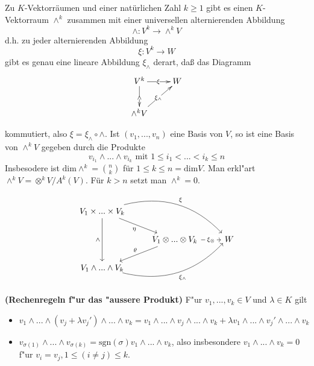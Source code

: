 \documentclass[8pt, a4paper, twocolumn, landscape]{article}
\begin{document}
\begin{theorem}
Zu $K$-Vektorräumen und einer natürlichen Zahl $k \geq 1$ gibt es einen $K$-Vektorraum
$\wedge^k$  zusammen mit einer universellen alternierenden Abbildung 
$$
\wedge: V^k \rightarrow \wedge ^k V
$$
d.h. zu jeder alternierenden Abbildung 
$$
\xi: V^k \rightarrow W
$$
gibt es genau eine lineare Abbildung $\xi_{\wedge}$ derart, daß das Diagramm 
\begin{gather*}
  \xymatrix{V^k   \ar[d]|{\wedge} \ar[r]|{\xi} & W\\
    \wedge^k V \ar[ur]|{\xi_\wedge} & }
\end{gather*}

kommutiert, also $\xi = \xi_\wedge \circ \wedge$. Ist $(v_1,...,v_n)$ eine Basis von $V$, so ist eine Basis von $\wedge^k V$ gegeben durch die Produkte 
$$
v_{i_1} \wedge ... \wedge v_{i_k} \text{ mit } 1 \leq i_1 < ... <  i_k \leq n
$$
Insbesodere ist $\mathrm{dim}\wedge^k = \binom{n}{k}$ für $ 1 \leq k \leq n = \mathrm{dim}V$. 
Man erkl"art \\ $\wedge^k V = \otimes^k V / A^k(V)$.
Für $k>n$ setzt man $
\wedge^k = 0.$

\begin{equation*}
\begin{tikzcd}
V_1 \times ... \times V_k \arrow[rd, "\eta"'] \arrow[rrd, "\xi", bend left] \arrow[dd, "\wedge"'] &                                                                                         &   \\
                                                                                                  & V_1 \otimes ... \otimes V_k \arrow[r, "\xi_\otimes" description] \arrow[ld, "\varrho"'] & W \\
V_1 \wedge ... \wedge V_k \arrow[rru, "\xi_\wedge"', bend right, shift left]                      &                                                                                         &  
\end{tikzcd}
\end{equation*}
\end{theorem}


\begin{remark}\textbf{(Rechenregeln f"ur das "aussere Produkt)}
F"ur $v_1, ..., v_k \in V$ und $\lambda \in K$ gilt
\begin{itemize}
\item $v_1 \wedge ... \wedge (v_j + \lambda v_j') \wedge ... \wedge v_k = v_1 \wedge ... \wedge v_j \wedge ... \wedge v_k + \lambda v_1 \wedge ... \wedge v_j' \wedge ... \wedge v_k$
\item $v_{\sigma(1)} \wedge ... \wedge v_{\sigma(k)} = \mathrm{sgn}(\sigma) v_1 \wedge ... \wedge v_k$, also insbesondere $v_1 \wedge ... \wedge v_k = 0$ f"ur $v_i = v_j, 1 \leq (i \neq j) \leq k$.
\end{itemize}
\end{remark}
\end{document}
